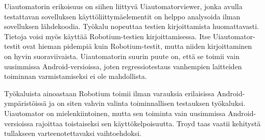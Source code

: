 Uiautomatorin erikoisuus on siihen liittyvä Uiautomatorviewer, jonka avulla testattavan sovelluksen käyttöliittymäelementit on helppo analysoida ilman sovelluksen lähdekoodia. Työkalu nopeuttaa testien kirjoittamista huomattavasti. Tietoja voisi myös käyttää Robotium-testien kirjoittamisessa. Itse Uiautomator-testit ovat hieman pidempiä kuin Robotium-testit, mutta niiden kirjoittaminen on hyvin suoraviivaista. Uiautomatorin suurin puute on, että se toimii vain uusimmissa Android-versioissa, joten regressiotestaus vanhempien laitteiden toiminnan varmistamiseksi ei ole mahdollista.

Työkaluista ainoastaan Robotium toimii ilman varauksia erilaisissa Android-ympäristöissä ja on siten vahvin valinta toiminnallisen testauksen työkaluksi. Uiautomator on mielenkiintoinen, mutta sen toiminta vain uusimmissa Android-versioissa rajoittaa toistaiseksi sen käyttökelpoisuutta. Troyd taas vaatii kehitystä tullakseen varteenotettavaksi vaihtoehdoksi.